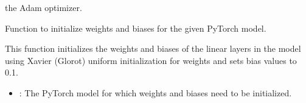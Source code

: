 \documentclass[letterpaper,10pt,english]{sphinxmanual}
\begin{document}
\begin{fulllineitems}
\begin{fulllineitems}
\begin{description}
\begin{itemize}
\end{itemize}

\begin{description}
\sphinxAtStartPar
the Adam optimizer.

\end{description}

\end{description}

\end{fulllineitems}


\begin{fulllineitems}
\label{\detokenize{NetworkHelper:NetworkHelper.NetworkHelper.init_weights}}
\pysigstartsignatures
{}
\pysigstopsignatures
\sphinxAtStartPar
Function to initialize weights and biases for the given PyTorch model.
\begin{description}
\sphinxAtStartPar
This function initializes the weights and biases of the linear layers in the model
using Xavier (Glorot) uniform initialization for weights and sets bias values to 0.1.

\begin{itemize}
\item {} 
\sphinxAtStartPar
{}: The PyTorch model for which weights and biases need to be initialized.

\end{itemize}

\end{description}

\end{fulllineitems}



\end{fulllineitems}
\end{document}
